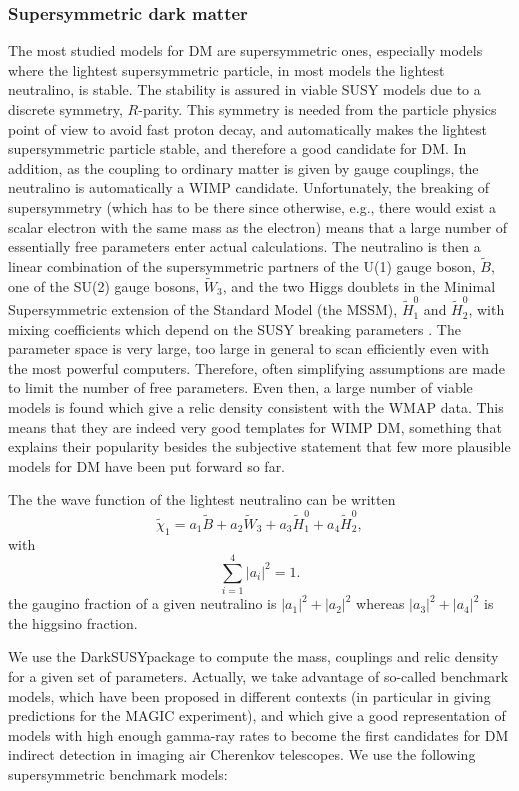 \documentclass[10pt,aps,pra,reprint,amsmath,amsfonts,amssymb,showpacs,nofootinbib,floatfix]{revtex4-1}
\newcommand{\ds}{{\sc DarkSUSY}}
\begin{document}
\subsubsection{Supersymmetric dark matter}
The most studied models for DM are supersymmetric ones, especially
models where the lightest supersymmetric particle, in most models the
lightest neutralino, is stable. The stability is assured in viable
SUSY models due to a discrete symmetry, $R$-parity. This symmetry is
needed from the particle physics point of view to avoid fast proton
decay, and automatically makes the lightest supersymmetric particle
stable, and therefore a good candidate for DM. In addition, as the
coupling to ordinary matter is given by gauge couplings, the
neutralino is automatically a WIMP candidate. Unfortunately, the
breaking of supersymmetry (which has to be there since otherwise,
e.g., there would exist a scalar electron with the same mass as the
electron) means that a large number of essentially free parameters
enter actual calculations.  The neutralino is then a linear
combination of the supersymmetric partners of the U(1) gauge boson,
$\tilde B$, one of the SU(2) gauge bosons, $\tilde W_3$, and the two
Higgs doublets in the Minimal Supersymmetric extension of the Standard
Model (the MSSM), $\tilde H_1^0$ and $\tilde H_2^0$, with mixing
coefficients which depend on the SUSY breaking parameters
\cite{1984NuPhB.238..453E}. The parameter space is very large, too
large in general to scan efficiently even with the most powerful
computers. Therefore, often simplifying assumptions are made to limit
the number of free parameters. Even then, a large number of viable
models is found which give a relic density consistent with the WMAP
data. This means that they are indeed very good templates for WIMP DM,
something that explains their popularity besides the subjective
statement that few more plausible models for DM have been put forward
so far.

The the wave function of the lightest neutralino can be written
\begin{equation}
\tilde\chi_1=a_1\tilde B+a_2\tilde W_3+a_3 \tilde H_1^0+a_4\tilde H_2^0,
\end{equation}
with 
\begin{equation}
\sum_{i=1}^4 |a_i|^2=1.
\end{equation}
the gaugino fraction of a given neutralino is $|a_1|^2+|a_2|^2$ whereas $|a_3|^2+|a_4|^2$ is the higgsino fraction. 


We use the \ds package \cite{ds} to compute the mass, couplings and
relic density for a given set of parameters.  Actually, we take
advantage of so-called benchmark models, which have been proposed in
different contexts (in particular in \cite{Bringmann:2008kj} giving
predictions for the MAGIC experiment), and which give a good
representation of models with high enough gamma-ray rates to become
the first candidates for DM indirect detection in imaging air
Cherenkov telescopes. We use the following supersymmetric benchmark
models:
\end{document}
